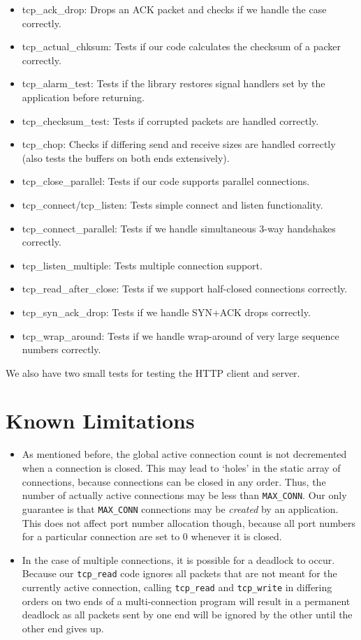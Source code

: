 \documentclass{article}
\begin{document}
\begin{itemize}
\item tcp\_ack\_drop: Drops an ACK packet and checks if we handle the case correctly.
\item tcp\_actual\_chksum: Tests if our code calculates the checksum of a packer correctly.
\item tcp\_alarm\_test: Tests if the library restores signal handlers set by the application before returning.
\item tcp\_checksum\_test: Tests if corrupted packets are handled correctly.
\item tcp\_chop: Checks if differing send and receive sizes are handled correctly (also tests the buffers on both ends extensively).
\item tcp\_close\_parallel: Tests if our code supports parallel connections.
\item tcp\_connect/tcp\_listen: Tests simple connect and listen functionality.
\item tcp\_connect\_parallel: Tests if we handle simultaneous 3-way handshakes correctly.
\item tcp\_listen\_multiple: Tests multiple connection support.
\item tcp\_read\_after\_close: Tests if we support half-closed connections correctly.
\item tcp\_syn\_ack\_drop: Tests if we handle SYN+ACK drops correctly.
\item tcp\_wrap\_around: Tests if we handle wrap-around of very large sequence numbers correctly.
\end{itemize}
We also have two small tests for testing the HTTP client and server.

\section{Known Limitations}
\begin{itemize}
\item As mentioned before, the global active connection count is not decremented when a connection is closed. This may lead to `holes' in the static array of connections, because connections can be closed in any order. Thus, the number of actually active connections may be less than \texttt{MAX\_CONN}. Our only guarantee is that \texttt{MAX\_CONN} connections may be \textit{created} by an application. This does not affect port number allocation though, because all port numbers for a particular connection are set to 0 whenever it is closed.

\item In the case of multiple connections, it is possible for a deadlock to occur. Because our \texttt{tcp\_read} code ignores all packets that are not meant for the currently active connection, calling \texttt{tcp\_read} and \texttt{tcp\_write} in differing orders on two ends of a multi-connection program will result in a permanent deadlock as all packets sent by one end will be ignored by the other until the other end gives up.
\end{itemize}
\end{document}
